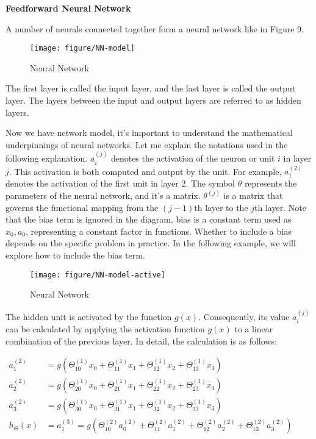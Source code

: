 \documentclass{article}
\begin{document}
    \noindent
    \textbf{Feedforward Neural Network}\\
    \noindent

    A number of neurals connected together form a neural network like in Figure 9.

    \begin{figure}[htbp]
        \centering
        \texttt{[image: figure/NN-model]}
        \caption{Neural Network}
        \end{figure}



    The first layer is called the input layer, and the last layer is called the output layer. The layers between the input and output layers are referred to as hidden layers.

    Now we have network model, it's important to understand the mathematical underpinnings of neural networks. Let me explain the notations used in the following explanation. $a^{(j)}_{i}$ denotes the activation of the neuron or unit $i$ in layer $j$. This activation is both computed and output by the unit. For example, $a^{(2)}_1$ denotes the activation of the first unit in layer 2. The symbol $\theta$ represents the parameters of the neural network, and it's a matrix. $\theta^{(j)}$ is a matrix that governs the functional mapping from the $(j-1)$th layer to the $j$th layer. Note that the bias term is ignored in the diagram, bias is a constant term used as $x_0, a_0$, representing a constant factor in functions. Whether to include a bias depends on the specific problem in practice. In the following example, we will explore how to include the bias term.


    \begin{figure}[htbp]
        \centering
        \texttt{[image: figure/NN-model-active]}
        \caption{Neural Network}
        \end{figure}

    The hidden unit is activated by the function $g(x)$. Consequently, its value $a^{(j)}_{i}$ can be calculated by applying the activation function $g(x)$ to a linear combination of the previous layer. In detail, the calculation is as follows:

    $\begin{aligned} a_1^{(2)} & =g\left(\Theta_{10}^{(1)} x_0+\Theta_{11}^{(1)} x_1+\Theta_{12}^{(1)} x_2+\Theta_{13}^{(1)} x_3\right) \\ a_2^{(2)} & =g\left(\Theta_{20}^{(1)} x_0+\Theta_{21}^{(1)} x_1+\Theta_{22}^{(1)} x_2+\Theta_{23}^{(1)} x_3\right) \\ a_3^{(2)} & =g\left(\Theta_{30}^{(1)} x_0+\Theta_{31}^{(1)} x_1+\Theta_{32}^{(1)} x_2+\Theta_{33}^{(1)} x_3\right) \\ h_{\Theta}(x) & =a_1^{(3)}=g\left(\Theta_{10}^{(2)} a_0^{(2)}+\Theta_{11}^{(2)} a_1^{(2)}+\Theta_{12}^{(2)} a_2^{(2)}+\Theta_{13}^{(2)} a_3^{(2)}\right)\end{aligned}$ \\
\end{document}
